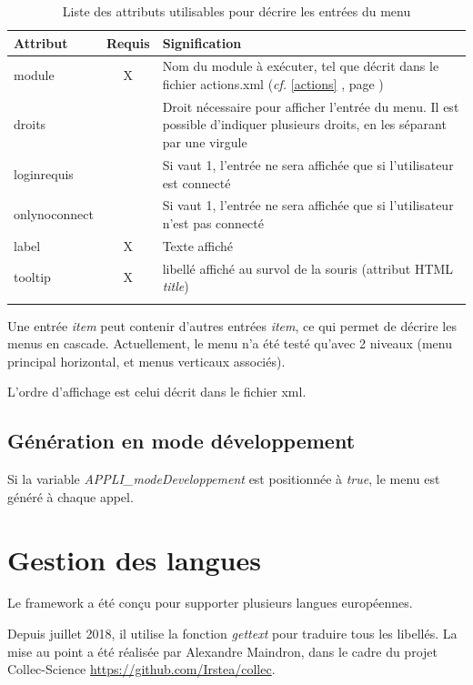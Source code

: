 \begin{longtable}{|p{2.5cm}|c|p{9cm}|}
\hline
\textbf{Attribut} & \textbf{Requis} & \textbf{Signification} \\
\hline
\endhead
module & X & Nom du module à exécuter, tel que décrit dans le fichier actions.xml (\textit{cf.} \ref{actions} \textit{\nameref{actions}}, page \pageref{actions})\\
 \hline
droits & & Droit nécessaire pour afficher l'entrée du menu. Il est possible d'indiquer plusieurs droits, en les séparant par une virgule\\
 \hline
loginrequis & & Si vaut 1, l'entrée ne sera affichée que si l'utilisateur est connecté \\
 \hline
onlynoconnect & & Si vaut 1, l'entrée ne sera affichée que si l'utilisateur n'est pas connecté\\
 \hline
label & X & Texte affiché\\
 \hline
tooltip & X & libellé affiché au survol de la souris (attribut HTML \textit{title})\\
 \hline

\caption{Liste des attributs utilisables pour décrire les entrées du menu}
\end{longtable}

Une entrée \textit{item} peut contenir d'autres entrées \textit{item}, ce qui permet de décrire les menus en cascade. Actuellement, le menu n'a été testé qu'avec 2 niveaux (menu principal horizontal, et menus verticaux associés).

L'ordre d'affichage est celui décrit dans le fichier xml.

\section{Génération en mode développement}

Si la variable \textit{APPLI\_modeDeveloppement} est positionnée à \textit{true}, le menu est généré à chaque appel.

\chapter{Gestion des langues}\label{langue}

Le framework a été conçu pour supporter plusieurs langues européennes.

Depuis juillet 2018, il utilise la fonction \textit{gettext} pour traduire tous les libellés. La mise au point a été réalisée par Alexandre Maindron, dans le cadre du projet Collec-Science \href{https://github.com/Irstea/collec}{https://github.com/Irstea/collec}.

